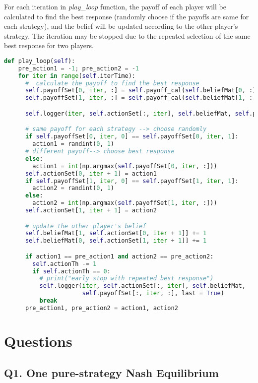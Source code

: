 \documentclass[a4paper, oneside, final, 12pt]{scrartcl} %
\begin{document}
For each iteration in \emph{play\_loop} function, the payoff of each player will be calculated to
find the best response (randomly choose if the payoffs are same for each strategy), 
and the belief will be updated according to the other player's strategy.
The iteration may be stopped due to the repeated selection of the same best response for two players.

\begin{lstlisting}[language=Python]
  def play_loop(self):
    pre_action1 = -1; pre_action2 = -1
    for iter in range(self.iterTime):
      #  calculate the payoff to find the best response
      self.payoffSet[0, iter, :] = self.payoff_cal(self.beliefMat[0, :], self.payoffMat[:2, :])
      self.payoffSet[1, iter, :] = self.payoff_cal(self.beliefMat[1, :], self.payoffMat[2:, :])

      self.logger(iter, self.actionSet[:, iter], self.beliefMat, self.payoffSet[:, iter, :])

      # same payoff for each strategy --> choose randomly
      if self.payoffSet[0, iter, 0] == self.payoffSet[0, iter, 1]:
        action1 = randint(0, 1)
      # different payoff--> choose best response
      else:
        action1 = int(np.argmax(self.payoffSet[0, iter, :]))
      self.actionSet[0, iter + 1] = action1
      if self.payoffSet[1, iter, 0] == self.payoffSet[1, iter, 1]:
        action2 = randint(0, 1)
      else:
        action2 = int(np.argmax(self.payoffSet[1, iter, :]))
      self.actionSet[1, iter + 1] = action2

      # update the other player's belief
      self.beliefMat[1, self.actionSet[0, iter + 1]] += 1
      self.beliefMat[0, self.actionSet[1, iter + 1]] += 1

      if action1 == pre_action1 and action2 == pre_action2:
        self.actionTh -= 1
        if self.actionTh == 0:
          # print("early stop with repeated best response")
          self.logger(iter, self.actionSet[:, iter], self.beliefMat,
                      self.payoffSet[:, iter, :], last = True)
          break
      pre_action1, pre_action2 = action1, action2
\end{lstlisting}

\endgroup

\newpage

\section{Questions}

\subsection{Q1. One pure-strategy Nash Equilibrium}
\end{document}
